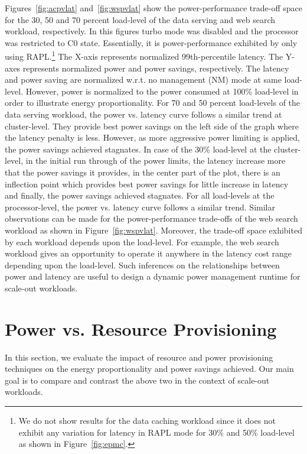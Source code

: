 \documentclass{sig-alternate}
\begin{document}
Figures~\ref{fig:acpvlat} and~\ref{fig:wspvlat} show the power-performance trade-off space for 
the 30, 50 and 70 percent load-level of the data serving and web search workload, respectively.
In this figures turbo mode was disabled and the processor was restricted to C0 state. Essentially, it is 
power-performance exhibited by only using RAPL.\footnote{We do not show results for the data caching 
workload since it does not exhibit any variation for latency in RAPL mode for 30\% and 50\% load-level 
as shown in Figure~\ref{fig:epmc}.} The X-axis represents normalized 99th-percentile latency. 
The Y-axes represents normalized power and power savings, respectively. 
The latency and power saving are normalized 
w.r.t. no management (NM) mode at same load-level. However, power is normalized to the 
power consumed at 100\% load-level in order to illustrate energy proportionality. 
For 70 and 50 percent load-levels of the data serving workload, the power vs. latency 
curve follows a similar trend at cluster-level. They provide best power savings on the left side of the graph 
where the latency penalty is less. However, as more aggressive power limiting is applied, the 
power savings achieved stagnates. In case of the 30\% load-level at the cluster-level, in the initial run through of the 
power limits, the latency increase more that the power savings it provides, in the center part of the plot, 
there is an inflection point which provides best power savings for little increase in latency and finally, 
the power savings achieved stagnates. For all load-levels at the processor-level, the power vs. latency curve 
follows a similar trend. Similar observations can be made for the power-performance trade-offs 
of the web search workload as shown in Figure~\ref{fig:wspvlat}. 
Moreover, the trade-off space exhibited by each workload depends upon the load-level. For example, the web search 
workload gives an opportunity to operate it anywhere in the  latency cost 
range depending upon the load-level. 
Such inferences on the relationships between power and latency are useful to design a 
dynamic power management runtime for scale-out workloads. 
 \section{Power vs. Resource Provisioning}
\label{sec:ppvrp}

In this section, we evaluate the impact of resource and power provisioning 
techniques on the energy proportionality and power savings achieved. Our main goal is 
to compare and contrast the above two in the context of scale-out workloads. 
\end{document}
